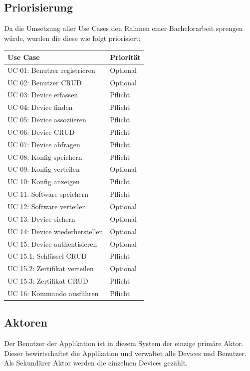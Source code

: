 \subsection{Priorisierung}
Da die Umsetzung aller Use Cases den Rahmen einer Bachelorarbeit sprengen würde, wurden die diese wie folgt priorisiert:
\begin{center}
\begin{longtable}{| p{5.5cm} | p{3cm} |}
\hline
\textbf{Use Case} & \textbf{Priorität}\\ \hline
UC 01: Benutzer registrieren     & Optional \\ \hline
UC 02: Benutzer CRUD	         & Optional \\ \hline 
UC 03: Device erfassen           & Pflicht \\ \hline 
UC 04: Device finden             & Pflicht \\ \hline 
UC 05: Device assoziieren        & Pflicht \\ \hline 
UC 06: Device CRUD               & Pflicht \\ \hline 
UC 07: Device abfragen           & Pflicht \\ \hline 
UC 08: Konfig speichern          & Pflicht \\ \hline 
UC 09: Konfig verteilen          & Optional \\ \hline 
UC 10: Konfig anzeigen           & Pflicht \\ \hline 
UC 11: Software speichern        & Pflicht \\ \hline 
UC 12: Software verteilen        & Optional \\ \hline 
UC 13: Device sichern            & Optional \\ \hline 
UC 14: Device wiederherstellen   & Optional \\ \hline 
UC 15: Device authentisieren     & Optional \\ \hline 
UC 15.1: Schlüssel CRUD          & Pflicht \\ \hline 
UC 15.2: Zertifikat verteilen    & Optional \\ \hline 
UC 15.3: Zertifikat CRUD         & Pflicht \\ \hline 
UC 16: Kommando ausführen        & Pflicht \\ \hline 
\end{longtable}
\end{center}
\subsection{Aktoren}
Der Benutzer der Applikation ist in diesem System der einzige primäre Aktor. Dieser bewirtschaftet die Applikation und verwaltet alle Devices und Benutzer. Als Sekundärer Aktor werden die einzelnen Devices gezählt.
\newpage
